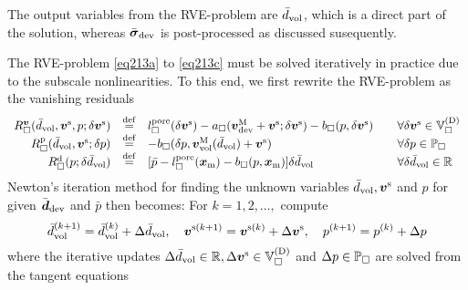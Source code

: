 \documentclass[10pt,a4paper]{article}
\newcommand{\pore}{\mathrm{pore}}
\newcommand{\ded}{\mathrm{d}}
\newcommand{\dep}{\mathrm{p}}
\begin{document}
The output variables from the RVE-problem are $\bar{d}_{\mathrm{vol}}$, which is a direct part of the solution, whereas $\bar{\boldsymbol{\sigma}}_{\mathrm{dev}}$ is post-processed as discussed susequently.

The RVE-problem \eqref{eq213a} to \eqref{eq213c} must be solved iteratively in practice due to the
subscale nonlinearities. To this end, we first rewrite the RVE-problem as the vanishing residuals
\begin{equation}
\begin{array}{rcll}
    R_\Box^{\ta v}(\bar{d}_\vol,\ta{v}^\fluct,p; \delta \ta{v}^\fluct)
    & \defeq &
    l_\Box^\pore(\delta \ta{v}^\fluct) -
    a_\Box(\ta{v}^\macro_\dev+\ta{v}^\fluct;\delta \ta{v}^\fluct) -
    b_\Box(p,\delta\ta{v}^\fluct)
    \quad & \forall \delta \ta{v}^\fluct\in\set{V}_\Box^{(\Dirichlet)}
    \\
    R_\Box^\dep(\bar{d}_\vol,\ta{v}^\fluct; \delta p)
    & \defeq &
    -  b_\Box(\delta p,\ta{v}^\macro_\vol(\bar{d}_\vol)+\ta{v}^\fluct)
    \quad & \forall \delta p\in\set{P}_\Box
    \\
     R_\Box^\ded(p;\delta\bar{d}_\vol)
    & \defeq &
    [\bar{p} - l_\Box^\pore(\ta{x}_\mean)- b_\Box(p,\ta{x}_\mean)]\delta\bar{d}_\vol
    \quad & \forall \delta\bar{d}_\vol  \in \set{R}
\end{array}
\label{eq250b}
\end{equation}
Newton's iteration method for finding the unknown variables
$\bar{d}_{\mathrm{vol}}, \boldsymbol{v}^{\mathrm{s}}$ and $p$ for given $\bar{\boldsymbol{d}}_{\mathrm{dev}}$ and $\bar{p}$ then becomes: For $k=1,2,\ldots,$ compute
\begin{equation}
    \bar{d}_{\mathrm{vol}}^{(k+1)} = \bar{d}_{\mathrm{vol}}^{(k)} + \Delta \bar{d}_{\mathrm{vol}}, \quad
    {\boldsymbol{v}}^{\mathrm{s}(k+1)} = {\boldsymbol{v}}^{\mathrm{s}(k)} + \Delta {\boldsymbol{v}}^{\mathrm{s}}, \quad
    p^{(k+1)} = p^{(k)} + \Delta p
\label{eq251}
\end{equation}
where the iterative updates $\Delta\bar{d}_{\mathrm{vol}}\in\mathbb{R}, \Delta {\boldsymbol{v}}^{\mathrm{s}}\in{\mathbb{V}}_\Box^{(\mathrm{D})}$ and $\Delta p \in{\mathbb{P}}_\Box$ are solved from the tangent equations
\end{document}

